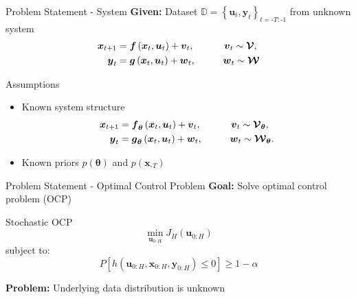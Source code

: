\documentclass[student, noshadow, itr, english, aspectratio=169]{ITR_LSR_slides}
\begin{document}
\begin{frame}{Problem Statement - System}	
	\textbf{Given:} Dataset $\mathbb{D} = \left\{\boldsymbol{u}_{t}, \boldsymbol{y}_{t}\right\}_{t = \text{-}T:\text{-}1}$ from unknown system
	\begin{equation*}
	\begin{split}
	\boldsymbol{x}_{t+1} &= \boldsymbol{f} \left( \boldsymbol{x}_{t}, \boldsymbol{u}_t \right) + \boldsymbol{v}_{t}, \makebox[1cm]{\hfill} \; \boldsymbol{v}_{t} \sim \boldsymbol{\mathcal{V}},\\
	\boldsymbol{y}_{t} &= \boldsymbol{g} \left( \boldsymbol{x}_{t}, \boldsymbol{u}_t \right) + \boldsymbol{w}_{t}, \makebox[1cm]{\hfill} \boldsymbol{w}_{t} \sim \boldsymbol{\mathcal{W}}
	\end{split}
	\end{equation*}

	\begin{block}{Assumptions}
	\begin{itemize}
		\item 
		Known system structure
	\begin{equation*}
	\begin{split}
	\boldsymbol{x}_{t+1} &= \boldsymbol{f}_{\boldsymbol{\theta}} \left( \boldsymbol{x}_{t}, \boldsymbol{u}_t \right) + \boldsymbol{v}_{t}, \makebox[1cm]{\hfill} \; \boldsymbol{v}_{t} \sim \boldsymbol{\mathcal{V}}_{\boldsymbol{\theta}},\\
	\boldsymbol{y}_{t} &= \boldsymbol{g}_{\boldsymbol{\theta}} \left( \boldsymbol{x}_{t}, \boldsymbol{u}_t \right) + \boldsymbol{w}_{t}, \makebox[1cm]{\hfill} \boldsymbol{w}_{t} \sim \boldsymbol{\mathcal{W}}_{\boldsymbol{\theta}}.
	\end{split}
	\end{equation*}
	\item 
	Known priors $p(\boldsymbol{\theta})$ and $p(\boldsymbol{x}_{\text{-}T})$
	\end{itemize}
	\end{block}	


\end{frame}

\begin{frame}{Problem Statement - Optimal Control Problem}	
	\textbf{Goal:} Solve optimal control problem (OCP)\\
	\begin{block}{Stochastic OCP}
		\begin{equation*}
		\min\limits_{\boldsymbol{u}_{0:H}} J_H(\boldsymbol{u}_{0:H}) 
		\end{equation*}
		subject to: 
		\begin{equation*}
		P \left[  h(\boldsymbol{u}_{0:H},  \boldsymbol{x}_{0:H},  \boldsymbol{y}_{0:H}) \leq 0 \right] \geq 1 - \alpha
		\end{equation*}
	\end{block}	
	\textbf{Problem:} Underlying data distribution is unknown
\end{frame}
\end{document}
